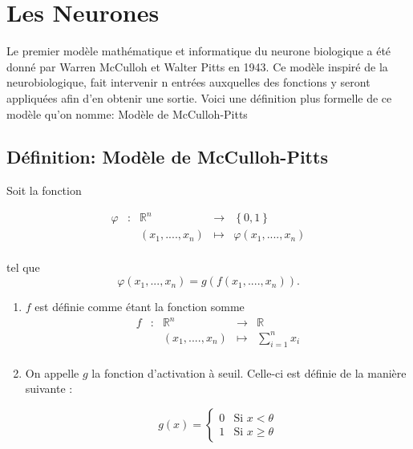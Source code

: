 \documentclass{article}
\newcommand{\fonction}[5]{
	\begin{array}{ccccc}
#1 & : & #2 & \to & #3\\
	& & #4 & \mapsto & #5\\ 
	\end{array}
}
\begin{document}
\section[Titre plus court]{Les Neurones}

Le premier modèle mathématique et informatique du neurone biologique a été donné par Warren McCulloh et Walter Pitts en 1943.
Ce modèle inspiré de la neurobiologique, fait intervenir n entrées auxquelles des fonctions y seront appliquées afin d'en obtenir une sortie.
Voici une définition plus formelle de ce modèle qu'on nomme: Modèle de McCulloh-Pitts     

\subsection{Définition: Modèle de McCulloh-Pitts}
	Soit la fonction  

	\[\fonction{\varphi}{\mathbb{R}^n}{\left\{0,1\right\}}{(x_1,....,x_n)}{\varphi(x_1,....,x_n)} \]

	tel que  
	\[\varphi (x_1,...,x_n) = g(f(x_1,....,x_n)). \]  

	\begin{enumerate}
		\item $f$ est définie comme étant la fonction somme 
		\[\fonction{f}{\mathbb{R}^n}{\mathbb{R}}{(x_1,....,x_n)}{\sum_{i=1}^{n} {x_i}} \] 
		\item On appelle $g$ la fonction d'activation à seuil. Celle-ci est définie de la manière suivante :

		\[g(x) = \begin{cases} 0 &\mbox{Si } x < \theta \\
				 1 & \mbox{Si } x \geq \theta
	 		 \end{cases} 
		\]
	\end{enumerate}


\vfill
\begin{center}
\end{center}
\vfill
\end{document}
